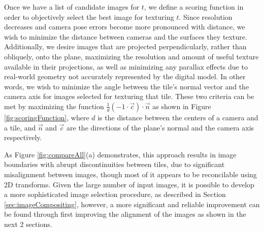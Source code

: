 \documentclass[]{spie}  %
\begin{document}
Once we have a list of candidate images for $t$, we define a scoring
function in order to objectively select the best image for texturing
$t$. Since resolution decreases and camera pose errors become more
pronounced with distance, we wish to minimize the distance between
cameras and the surfaces they texture. Additionally, we desire images
that are projected perpendicularly, rather than obliquely, onto the
plane, maximizing the resolution and amount of useful texture
available in their projections, as well as minimizing any parallax
effects due to real-world geometry not accurately represented by the
digital model. In other words, we wish to minimize the angle between
the tile's normal vector and the camera axis for images selected for
texturing that tile. These two criteria can be met by maximizing the
function $\frac{1}{d} (-1 \cdot \vec{c}) \cdot \vec{n}$ as shown in
Figure \ref{fig:scoringFunction}, where $d$ is the distance between
the centers of a camera and a tile, and $\vec{n}$ and $\vec{c}$ are
the directions of the plane's normal and the camera axis respectively.


As Figure \ref{fig:compareAll}(a) demonstrates, this approach results
in image boundaries with abrupt discontinuities between tiles, due to
significant misalignment between images, though most of it appears to
be reconcilable using 2D transforms. Given the large number of input
images, it is possible to develop a more sophisticated image selection
procedure, as described in Section \ref{sec:imageCompositing},
however, a more significant and reliable improvement can be found
through first improving the alignment of the images as shown in the
next 2 sections.
\end{document}

